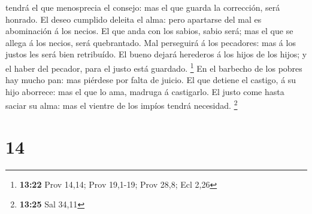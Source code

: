 tendrá el que menosprecia el consejo: mas el que guarda la corrección,
será honrado.  El deseo cumplido deleita el alma: pero
apartarse del mal es abominación á los necios.  El que anda
con los sabios, sabio será; mas el que se allega á los necios, será
quebrantado.  Mal perseguirá á los pecadores: mas á los
justos les será bien retribuído.  El bueno dejará herederos
á los hijos de los hijos; y el haber del pecador, para el justo está
guardado. \footnote{\textbf{13:22} Prov 14,14; Prov 19,1-19; Prov 28,8;
  Ecl 2,26}  En el barbecho de los pobres hay mucho pan:
mas piérdese por falta de juicio.  El que detiene el
castigo, á su hijo aborrece: mas el que lo ama, madruga á castigarlo.
 El justo come hasta saciar su alma: mas el vientre de los
impíos tendrá necesidad. \footnote{\textbf{13:25} Sal 34,11}

\hypertarget{section-13}{%
\section{14}\label{section-13}}

